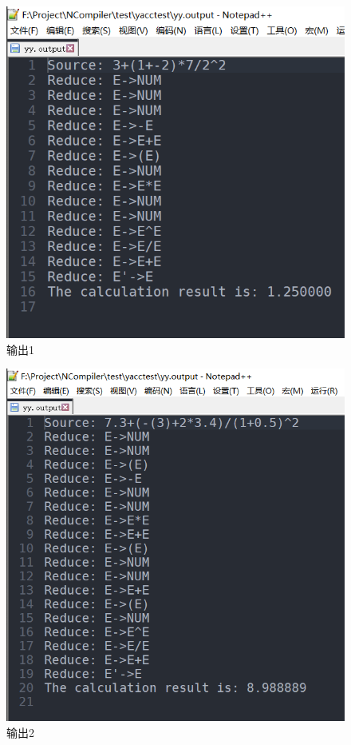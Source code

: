 \documentclass[a4paper]{ctexart} %
\begin{document}
	\begin{figure}[h]
		\centering
		\includegraphics[scale=0.38]{../picture/yacc/输出1.png}
		\caption[l]{输出1}
	\end{figure}

	\begin{figure}[h]
		\centering
		\includegraphics[scale=0.38]{../picture/yacc/输出2.png}
		\caption[l]{输出2}
	\end{figure}
	\newpage
\end{document}

